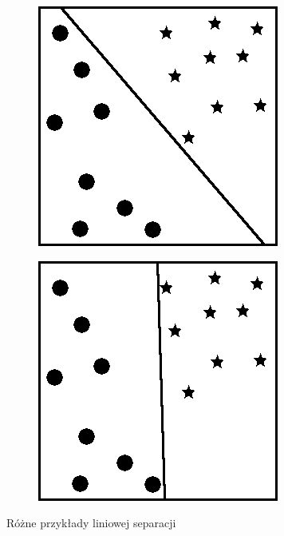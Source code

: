 \begin{figure}[h!]
\begin{subfigure}[b]{0.33\textwidth}
        \includegraphics[width=\linewidth]{img/granica_2.jpg}
    \end{subfigure}%
    \begin{subfigure}[b]{0.33\textwidth}
        \includegraphics[width=\linewidth]{img/granica_3.jpg}
    \end{subfigure}
    \caption{Różne przykłady liniowej separacji}
    \label{fig:liniowa_separacja}
\end{figure}


